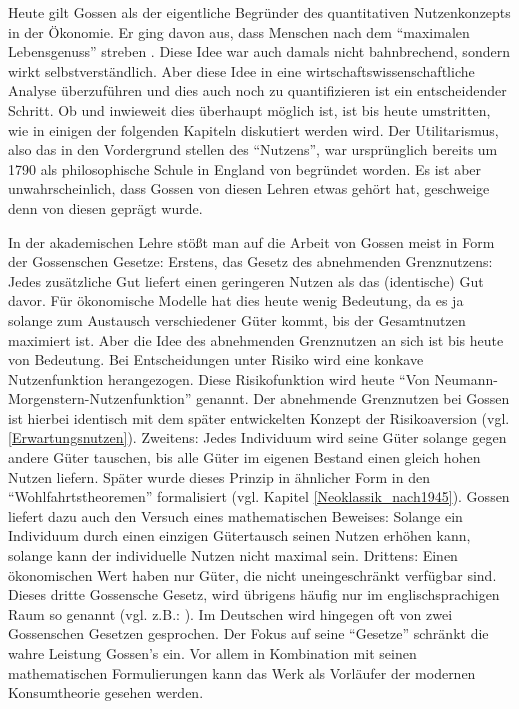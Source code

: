 Heute gilt Gossen als der eigentliche Begründer des quantitativen Nutzenkonzepts in der Ökonomie. Er ging davon aus, dass Menschen nach dem "`maximalen Lebensgenuss"' streben \parencite[S. 284]{Rosner2012}. Diese Idee war auch damals nicht bahnbrechend, sondern wirkt selbstverständlich. Aber diese Idee in eine wirtschaftswissenschaftliche Analyse überzuführen und dies auch noch zu quantifizieren ist ein entscheidender Schritt. Ob und inwieweit dies überhaupt möglich ist, ist bis heute umstritten, wie in einigen der folgenden Kapiteln diskutiert werden wird. Der Utilitarismus, also das in den Vordergrund stellen des "`Nutzens"', war ursprünglich bereits um 1790 als philosophische Schule in England von \textcite{Bentham1789} begründet worden. Es ist aber unwahrscheinlich, dass Gossen von diesen Lehren etwas gehört hat, geschweige denn von diesen geprägt wurde. 

In der akademischen Lehre stößt man auf die Arbeit von Gossen meist in Form der Gossenschen Gesetze: Erstens, das Gesetz des abnehmenden Grenznutzens: Jedes zusätzliche Gut liefert einen geringeren Nutzen als das (identische) Gut davor. Für ökonomische Modelle hat dies heute wenig Bedeutung, da es ja solange zum Austausch verschiedener Güter kommt, bis der Gesamtnutzen maximiert ist. Aber die Idee des abnehmenden Grenznutzen an sich ist bis heute von Bedeutung. Bei Entscheidungen unter Risiko wird eine konkave Nutzenfunktion herangezogen. Diese Risikofunktion wird heute "`Von Neumann-Morgenstern-Nutzenfunktion"' genannt. Der abnehmende Grenznutzen bei Gossen ist hierbei identisch mit dem später entwickelten Konzept der Risikoaversion (vgl. \ref{Erwartungsnutzen}).
Zweitens: Jedes Individuum wird seine Güter solange gegen andere Güter tauschen, bis alle Güter im eigenen Bestand einen gleich hohen Nutzen liefern. Später wurde dieses Prinzip in ähnlicher Form in den "`Wohlfahrtstheoremen"' formalisiert (vgl. Kapitel \ref{Neoklassik_nach1945}). Gossen liefert dazu auch den Versuch eines mathematischen Beweises: Solange ein Individuum durch einen einzigen Gütertausch seinen Nutzen erhöhen kann, solange kann der individuelle Nutzen nicht maximal sein.
Drittens: Einen ökonomischen Wert haben nur Güter, die nicht uneingeschränkt verfügbar sind. Dieses dritte Gossensche Gesetz, wird übrigens häufig nur im englischsprachigen Raum so genannt (vgl. z.B.: \parencite{Blaug1973}). Im Deutschen wird hingegen oft von zwei Gossenschen Gesetzen gesprochen.
Der Fokus auf seine "`Gesetze"' schränkt die wahre Leistung Gossen's ein. Vor allem in Kombination mit seinen mathematischen Formulierungen kann das Werk als Vorläufer der modernen Konsumtheorie gesehen werden.

